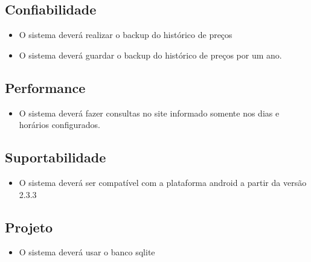 \subsection{Confiabilidade}

\begin{itemize}

	\item O sistema deverá realizar o backup do histórico de preços
	\item O sistema deverá guardar o backup do histórico de preços por um ano. 

\end{itemize}


\subsection{Performance}

\begin{itemize}

	\item O sistema deverá fazer consultas no site informado somente nos dias e horários configurados.

\end{itemize}


\subsection{Suportabilidade}

\begin{itemize}

	\item O sistema deverá ser compatível com a plataforma android a partir da versão 2.3.3

\end{itemize}


\subsection{Projeto}

\begin{itemize}

	\item O sistema deverá usar o banco sqlite
\end{itemize}

